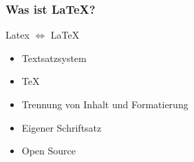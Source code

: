 \begin{frame}
    \frametitle{Was ist \LaTeX?}
    \begin{block}{Latex $\Leftrightarrow$ \LaTeX}
        \pause
        \begin{itemize}
            \item Textsatzsystem
            \item \TeX
            \item Trennung von Inhalt und Formatierung
            \item Eigener Schriftsatz
            \item Open Source
        \end{itemize}
    \end{block}
\end{frame}
